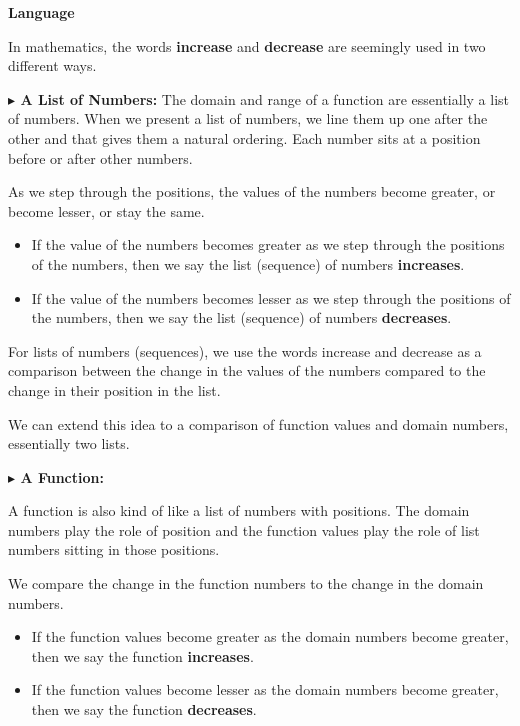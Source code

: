 \documentclass{ximera}
\begin{document}
\begin{warning} \textbf{\textcolor{red!70!black}{Language}}

In mathematics, the words \textbf{increase} and \textbf{decrease} are seemingly used in two different ways. 


\textbf{\textcolor{blue!55!black}{$\blacktriangleright$ A List of Numbers:}} The domain and range of a function are essentially a list of numbers. When we present a list of numbers, we line them up one after the other and that gives them a natural ordering.  Each number sits at a position before or after other numbers. 

As we step through the positions, the values of the numbers become greater, or become lesser, or stay the same. 

\begin{itemize}
    \item If the value of the numbers becomes greater as we step through the positions of the numbers, then we say the list (sequence) of numbers \textbf{increases}.  
    \item If the value of the numbers becomes lesser as we step through the positions of the numbers, then we say the list (sequence) of numbers \textbf{decreases}. 
\end{itemize}


For lists of numbers (sequences), we use the words increase and decrease as a comparison between the change in the values of the numbers compared to the change in their position in the list. 


We can extend this idea to a comparison of function values and domain numbers, essentially two lists. 

\textbf{\textcolor{blue!55!black}{$\blacktriangleright$ A Function:}} 

A function is also kind of like a list of numbers with positions.  The domain numbers play the role of position and the function values play the role of list numbers sitting in those positions. 

We compare the change in the function numbers to the change in the domain numbers. 

\begin{itemize}
    \item If the function values become greater as the domain numbers become greater, then we say the function \textbf{increases}.  
    \item If the function values become lesser as the domain numbers become greater, then we say the function \textbf{decreases}.  
\end{itemize}


\end{warning}
\end{document}

